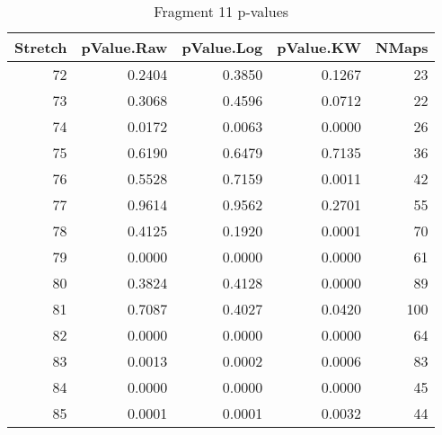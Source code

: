 \documentclass[14pt]{article}
\begin{document}
\begin{table}[ht]
\centering
\begin{tabular}{rrrrr}
  \hline
Stretch & pValue.Raw & pValue.Log & pValue.KW & NMaps \\ 
  \hline
72 & 0.2404 & 0.3850 & 0.1267 & 23 \\ 
  73 & 0.3068 & 0.4596 & 0.0712 & 22 \\ 
  74 & 0.0172 & 0.0063 & 0.0000 & 26 \\ 
  75 & 0.6190 & 0.6479 & 0.7135 & 36 \\ 
  76 & 0.5528 & 0.7159 & 0.0011 & 42 \\ 
  77 & 0.9614 & 0.9562 & 0.2701 & 55 \\ 
  78 & 0.4125 & 0.1920 & 0.0001 & 70 \\ 
  79 & 0.0000 & 0.0000 & 0.0000 & 61 \\ 
  80 & 0.3824 & 0.4128 & 0.0000 & 89 \\ 
  81 & 0.7087 & 0.4027 & 0.0420 & 100 \\ 
  82 & 0.0000 & 0.0000 & 0.0000 & 64 \\ 
  83 & 0.0013 & 0.0002 & 0.0006 & 83 \\ 
  84 & 0.0000 & 0.0000 & 0.0000 & 45 \\ 
  85 & 0.0001 & 0.0001 & 0.0032 & 44 \\ 
   \hline
\end{tabular}
\caption{Fragment 11 p-values} 
\end{table}
\end{document}
